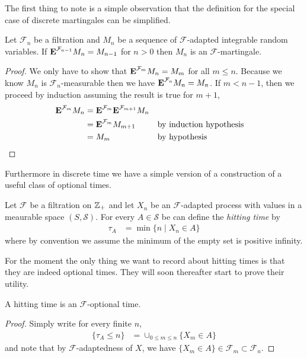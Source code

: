 The first thing to note is a simple observation that the definition
for the special case of discrete martingales can be simplified.
\begin{lem}Let $\mathcal{F}_n$ be a filtration and $M_n$ be a sequence
  of $\mathcal{F}$-adapted integrable random variables.  If
  $\textbf{E}^{\mathcal{F}_{n-1}} M_n = M_{n-1}$ for $n > 0$ then $M_n$
  is an $\mathcal{F}$-martingale.
\end{lem}
\begin{proof}We only have to show that
  $\textbf{E}^{\mathcal{F}_m} M_n = M_m$ for all $m \leq n$.
  Because we know $M_n$ is $\mathcal{F}_n$-measurable then we have
  $\textbf{E}^{\mathcal{F}_n} M_n = M_n$.  If $m < n-1$, then we
  proceed by induction
  assuming the result is true for $m+1$,
\begin{align*}
\textbf{E}^{\mathcal{F}_m} M_n &=
\textbf{E}^{\mathcal{F}_m} \textbf{E}^{\mathcal{F}_{m+1}} M_n \\
&=\textbf{E}^{\mathcal{F}_m} M_{m+1} & & \text{by induction hypothesis}\\
&= M_m & & \text{by hypothesis}
\end{align*}
\end{proof}

Furthermore in discrete time we have a simple version of a
construction of a useful class of optional times.
\begin{defn}Let $\mathcal{F}$ be a filtration on $\mathbb{Z}_+$ and let
  $X_n$ be an $\mathcal{F}$-adapted process with values in a meaurable
  space $(S, \mathcal{S})$.  For every $A \in \mathcal{S}$ be can
  define the \emph{hitting time} by
\begin{align*}
\tau_A &= \min \lbrace n \mid X_n \in A \rbrace
\end{align*}
where by convention we assume the minimum of the empty set is positive infinity.
\end{defn}

For the moment the only thing we want to record about hitting times is
that they are indeed optional times.  They will soon thereafter start to prove their utility.
\begin{lem}\label{HittingTimesDiscrete}A hitting time is an
  $\mathcal{F}$-optional time.
\end{lem}
\begin{proof}
Simply write for every finite $n$,
\begin{align*}
\lbrace \tau_A \leq n \rbrace &= \cup_{0 \leq m \leq n} \lbrace X_m
\in A \rbrace
\end{align*}
and note that by $\mathcal{F}$-adaptedness of $X$, we have $\lbrace X_m
\in A \rbrace \in \mathcal{F}_m \subset \mathcal{F}_n$.
\end{proof}

